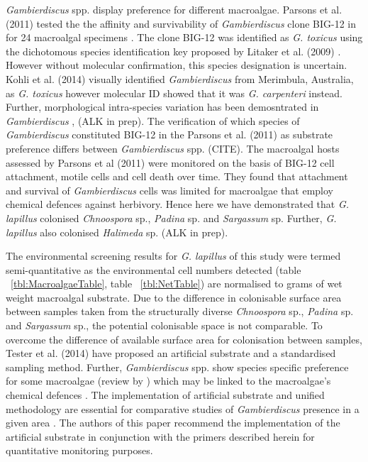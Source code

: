 \documentclass[12pt]{article}
\begin{document}
\emph{Gambierdiscus} spp. display preference for different macroalgae. Parsons et al. (2011) tested the the affinity and survivability of \emph{Gambierdiscus} clone BIG-12 in for 24 macroalgal specimens \cite{parsons2011examination}. The clone BIG-12 was identified as \emph{G. toxicus} using  the dichotomous species identification key proposed by Litaker et al. (2009) \cite{litaker2009taxonomy}. However without molecular confirmation, this species designation is uncertain. Kohli et al. (2014) visually identified \emph{Gambierdiscus} from Merimbula, Australia, as \emph{G. toxicus} however molecular ID showed that it was \emph{G. carpenteri} instead. Further, morphological intra-species variation has been demosntrated in \emph{Gambierdiscus} \cite{bravo2014cellular}, (ALK in prep). The verification of which species of \emph{Gambierdiscus} constituted BIG-12 in the Parsons et al. (2011) as substrate preference differs between \emph{Gambierdiscus} spp. \cite{parsons2011examination}(CITE). The macroalgal hosts assessed by Parsons et al (2011) were monitored on the basis of BIG-12 cell attachment, motile cells and cell death over time. They found that attachment and survival of \emph{Gambierdiscus} cells was limited for macroalgae that employ chemical defences against herbivory.
Hence here we have demonstrated that \emph{G. lapillus} colonised \emph{Chnoospora} sp., \emph{Padina} sp. and \emph{Sargassum} sp. Further, \emph{G. lapillus} also colonised \emph{Halimeda} sp. (ALK in prep).

The environmental screening results for \emph{G. lapillus} of this study were termed semi-quantitative as the environmental cell numbers detected (table ~\ref{tbl:MacroalgaeTable}, table ~\ref{tbl:NetTable}) are normalised to grams of wet weight macroalgal substrate. Due to the difference in colonisable surface area between samples taken from the structurally diverse \emph{Chnoospora} sp., \emph{Padina} sp. and \emph{Sargassum} sp., the potential colonisable space is not comparable. To overcome the difference of available surface area for colonisation between samples, Tester et al. (2014) have proposed an artificial substrate and a standardised sampling method. Further, \emph{Gambierdiscus} spp. show species specific preference for some macroalgae (review by \citep{cruz2006macroalgal}) which may be linked to the macroalgae's chemical defences \cite{parsons2011examination}. The implementation of artificial substrate and unified methodology are essential for comparative studies of \emph{Gambierdiscus} presence in a  given area \cite{tester2014sampling}. The authors of this paper recommend the implementation of the artificial substrate in conjunction with the primers described herein for quantitative monitoring purposes.
\end{document}
